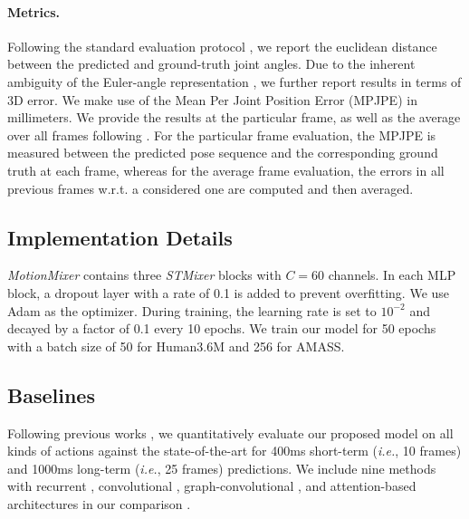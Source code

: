 \documentclass{article}
\begin{document}
\begin{table*} [ht]
{\begin{tabular}{|c|ccccc|ccccc|ccccc|ccccc|}
\end{tabular}
}
\caption{Performance comparison between different methods in terms of short-term and long-term pose prediction via mean per joint position error for each activity from the Human3.6M dataset. We provide the error results for the particular frame as well as the average over all frames. ($\dagger$) indicates methods that compute the average error over all frames. All other approaches evaluate at the particular frame, where the error is measured between the predictions and ground truth at each frame. The best performance is highlighted in boldface.} 
\label{tab:h36_all_3d}
\end{table*}

\paragraph{Metrics.} Following the standard evaluation protocol \cite{li2018convolutional,mao2020history,sofianos2021space}, we report the euclidean distance between the predicted and ground-truth joint angles. Due to the inherent ambiguity of the Euler-angle representation \cite{mao2019learning,mao2020history}, we further report results in terms of 3D error. We make use of the Mean Per Joint Position Error (MPJPE) in millimeters. We provide the results at the particular frame, as well as the average over all frames following \cite{sofianos2021space,zhong2022spatial}. For the particular frame evaluation, the MPJPE is measured between the predicted pose sequence and the corresponding ground truth at each frame, whereas for the average frame evaluation, the errors in all previous frames w.r.t. a considered one are computed and then averaged.

\subsection{Implementation Details}
\textit{MotionMixer} contains three \textit{STMixer} blocks with  $C = 60$ channels. In each MLP block, a dropout layer with a rate of 0.1 is added to prevent overfitting. We use Adam \cite{kingma2014adam} as the optimizer. During training, the learning rate is set to $10^{-2}$ and decayed by a factor of 0.1 every 10 epochs.  We train our model for 50 epochs with a batch size of 50 for Human3.6M and 256 for AMASS. 

\subsection{Baselines } Following previous works \cite{martinez2017human,li2018convolutional,mao2019learning}, we quantitatively evaluate our proposed model on all kinds of actions against the state-of-the-art for 400ms short-term  ({\em i.e.}, 10 frames) and 1000ms long-term  ({\em i.e.}, 25 frames) predictions. 
We include nine methods with recurrent \cite{martinez2017human,mao2020history}, convolutional \cite{li2018convolutional,tang2018long}, graph-convolutional \cite{mao2019learning,sofianos2021space,dang2021msr,zhong2022spatial}, and attention-based architectures  \cite{mao2021multi} in our comparison . 
\end{document}
